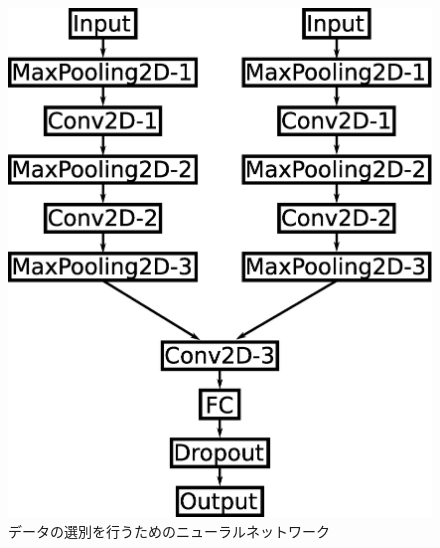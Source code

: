 \documentclass{jps-cp}
\begin{document}
\begin{figure}
  \centering
  \begin{minipage}{0.4\columnwidth}
    \centering
    \includegraphics[clip, width=0.9\columnwidth]{eps/event_selection.eps}
    \caption{データの選別を行うためのニューラルネットワーク}
    \label{fig:selection}
  \end{minipage}
  \hfill
  \begin{minipage}{0.4\columnwidth}
    \centering

\end{minipage}
\end{figure}
\end{document}
